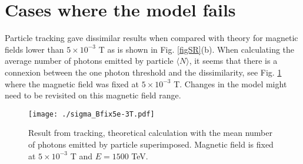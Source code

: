 \section{Cases where the model fails}
Particle tracking gave dissimilar results when compared with theory for magnetic fields lower than $5\times 10^{-3}$ T as is shown in Fig. \ref{figSR}(b). When calculating the average number of photons emitted by particle $\langle N\rangle$, it seems that there is a connexion between the one photon threshold and the dissimilarity, see Fig. \ref{figPhotons} where the magnetic field was fixed at $5 \times 10^{-3}$ T. %
Changes in the model might need to be revisited on this magnetic field range.
\begin{figure}[htb]
\centering
\texttt{[image: ./sigma\_Bfix5e-3T.pdf]} \caption{Result from tracking, theoretical calculation with the mean number of photons emitted by particle superimposed. Magnetic field is fixed at $5\times 10^{-3}$ T and $E=1500$ TeV.}\label{figPhotons}
\end{figure}
